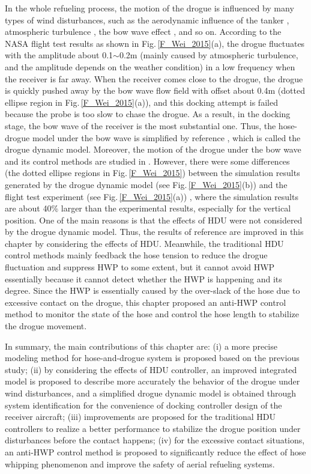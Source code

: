 In the whole refueling process, the motion of the drogue is influenced
by many types of wind disturbances, such as the aerodynamic influence
of the tanker \cite{Yue2016}, atmospheric turbulence \cite{Chen2007},
the bow wave effect \cite{Dibley2007PhaseI}, and so on. According
to the NASA flight test results \cite{Dibley2007PhaseI} as shown
in Fig.\,\ref{F_Wei_2015}(a), the drogue fluctuates with the amplitude
about 0.1$\sim$0.2m (mainly caused by atmospheric turbulence, and
the amplitude depends on the weather condition) in a low frequency
when the receiver is far away. When the receiver comes close to the
drogue, the drogue is quickly pushed away by the bow wave flow field
with offset about 0.4m (dotted ellipse region in Fig.\,\ref{F_Wei_2015}(a)),
and this docking attempt is failed because the probe is too slow to
chase the drogue. As a result, in the docking stage, the bow wave
of the receiver is the most substantial one. Thus, the hose-drogue
model under the bow wave is simplified by reference \cite{Wei2015,Dai2015},
which is called the drogue dynamic model. Moreover, the motion of
the drogue under the bow wave and its control methods are studied
in \cite{dai2018terminal,dai2018iterative,ren2019Reliable}. However,
there were some differences (the dotted ellipse regions in Fig.\,\ref{F_Wei_2015})
between the simulation results generated by the drogue dynamic model
(see Fig.\,\ref{F_Wei_2015}(b)) and the flight test experiment (see
Fig.\,\ref{F_Wei_2015}(a)) \cite{Dibley2007PhaseI}, where the simulation
results are about 40\% larger than the experimental results, especially
for the vertical position. One of the main reasons is that the effects
of HDU were not considered by the drogue dynamic model. Thus, the
results of reference \cite{Wei2015} are improved in this chapter by
considering the effects of HDU. Meanwhile, the traditional HDU control
methods mainly feedback the hose tension to reduce the drogue fluctuation
and suppress HWP to some extent, but it cannot avoid HWP essentially
because it cannot detect whether the HWP is happening and its degree.
Since the HWP is essentially caused by the over-slack of the hose
due to excessive contact on the drogue, this chapter proposed an anti-HWP
control method to monitor the state of the hose and control the hose
length to stabilize the drogue movement.

In summary, the main contributions of this chapter are: (i) a more precise
modeling method for hose-and-drogue system is proposed based on the
previous study; (ii) by considering the effects of HDU controller,
an improved integrated model is proposed to describe more accurately
the behavior of the drogue under wind disturbances, and a simplified
drogue dynamic model is obtained through system identification for
the convenience of docking controller design of the receiver aircraft;
(iii) improvements are proposed for the traditional HDU controllers
to realize a better performance to stabilize the drogue position under
disturbances before the contact happens; (iv) for the excessive contact
situations, an anti-HWP control method is proposed to significantly
reduce the effect of hose whipping phenomenon and improve the safety
of aerial refueling systems.

